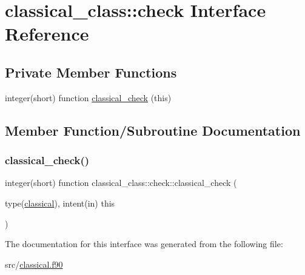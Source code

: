 \hypertarget{interfaceclassical__class_1_1check}{}\section{classical\+\_\+class\+:\+:check Interface Reference}
\label{interfaceclassical__class_1_1check}
\subsection*{Private Member Functions}
\begin{DoxyCompactItemize}
\item 
integer(short) function \hyperlink{interfaceclassical__class_1_1check_a4782f7126730047517a82ba29f0355f3}{classical\+\_\+check} (this)
\end{DoxyCompactItemize}


\subsection{Member Function/\+Subroutine Documentation}
\mbox{\label{interfaceclassical__class_1_1check_a4782f7126730047517a82ba29f0355f3}} 
\subsubsection{\texorpdfstring{classical\+\_\+check()}{classical\_check()}}
{\footnotesize\ttfamily integer(short) function classical\+\_\+class\+::check\+::classical\+\_\+check (\begin{DoxyParamCaption}\item[{type(\hyperlink{structclassical__class_1_1classical}{classical}), intent(in)}]{this }\end{DoxyParamCaption})\hspace{0.3cm}{\ttfamily [private]}}



The documentation for this interface was generated from the following file\+:\begin{DoxyCompactItemize}
\item 
src/\hyperlink{classical_8f90}{classical.\+f90}\end{DoxyCompactItemize}
